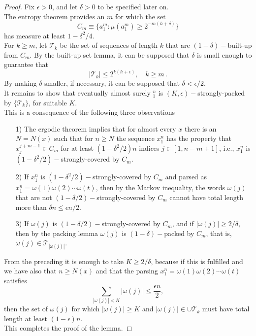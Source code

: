 \begin{proof}
    Fix $\epsilon>0$, and let $\delta>0$ to be specified later on.
    \\The entropy theorem provides an $m$ for which the set 
    \begin{equation*}
        C_m \equiv \{ a_1^m  : \mu(a_1^m) \geq 2^{-m(h+\delta)}\}
    \end{equation*}
    has measure at least $1-\delta^2/4$.
    \\For $k \geq m$, let $\mathcal{T}_k$ be the set of sequences of length $k$ that are $(1-\delta)-$built-up from $C_m$.
    By the built-up set lemma, it can be supposed that $\delta$ is small enough to guarantee that 
    \begin{equation*}
        |\mathcal{T}_k| \leq 2^{k(h+\epsilon)}, \quad k \geq m \, .
    \end{equation*}
    By making $\delta$ smaller, if necessary, it can be supposed that $\delta < \epsilon/2$.
    \\It remains to show that eventually almost surely $_1^n$ is $(K, \epsilon)-$strongly-packed by $\{ \mathcal{T}_k\}$, for suitable $K$.
    \\This is a consequence of the following three observations
    \begin{itemize}
        \item[1)] The ergodic theorem implies that for almost every $x$ there is an $N=N(x)$ such that for  $n \geq N$ the sequence $x_1^n$ has the property that $x_j^{j+m-1} \in C_m$ for at least $(1 - \delta^2/2)n$ indices $j \in [1, n-m+1]$, i.e., $x_1^n$ is $(1 - \delta^2/2)-$strongly-covered by $C_m$.
        \item[2)] If $x_1^n$ is $(1 - \delta^2/2)-$strongly-covered by $C_m$ and parsed as $x_1^n = \omega(1) \omega(2) \cdots \omega(t)$, then by the Markov inequality, the words $\omega(j)$ that are not $(1 - \delta/2)-$strongly-covered by $C_m$ cannot have total length more than $\delta n \leq \epsilon n /2$.
        \item[3)] If $\omega(j)$ is $(1 - \delta/2)-$strongly-covered by $C_m$, and if $|\omega(j)| \geq 2/\delta$, then by the packing lemma $\omega(j)$ is $(1 - \delta)-$packed by $C_m$, that is, $\omega(j) \in \mathcal{T}_{|\omega(j)|}$.
    \end{itemize}
    From the preceding it is enough to take $K\geq 2/\delta$, because if this is fulfilled and we have also that $n \geq N(x)$ and that the parsing $x_1^n = \omega(1) \omega(2) \cdots \omega(t)$ satisfies 
    \begin{equation*}
        \sum_{|\omega(j)| < K} |\omega(j)| \leq \frac{\epsilon n}{2},
    \end{equation*}
    then the set of $\omega(j)$ for which $|\omega(j)| \geq K$ and $|\omega(j)| \in \cup \mathcal{T}_k$ must have total length at least $(1-\epsilon)n$.
    \\This completes the proof of the lemma.
\end{proof}
